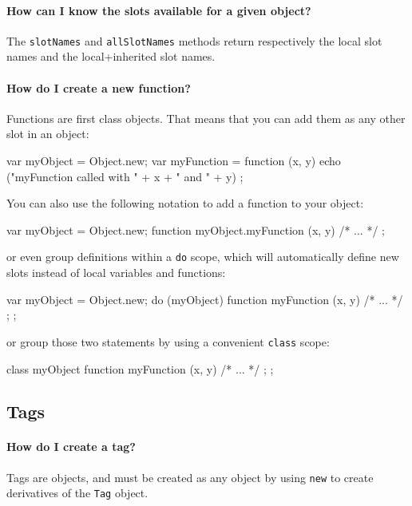 \paragraph{How can I know the slots available for a given object?}
The \lstinline{slotNames} and \lstinline{allSlotNames} methods return
respectively the local slot names and the local+inherited slot names.

\paragraph{How do I create a new function?}
Functions are first class objects. That means that you can add them as
any other slot in an object:

\begin{urbifixme}
var myObject = Object.new;
var myFunction = function (x, y)
  { echo ("myFunction called with " + x + " and " + y) };
\end{urbifixme}

You can also use the following notation to add a function to your
object:

\begin{urbifixme}
var myObject = Object.new;
function myObject.myFunction (x, y) { /* ... */ };
\end{urbifixme}

or even group definitions within a \lstinline{do} scope, which will
automatically define new slots instead of local variables and
functions:

\begin{urbifixme}
var myObject = Object.new;
do (myObject) {
  function myFunction (x, y) { /* ... */ };
};
\end{urbifixme}

or group those two statements by using a convenient \lstinline{class}
scope:

\begin{urbifixme}
class myObject {
  function myFunction (x, y) { /* ... */ };
};
\end{urbifixme}

\subsection{Tags}

\paragraph{How do I create a tag?}


Tags are objects, and must be created as any object by using
\lstinline{new} to create derivatives of the \lstinline{Tag} object.

